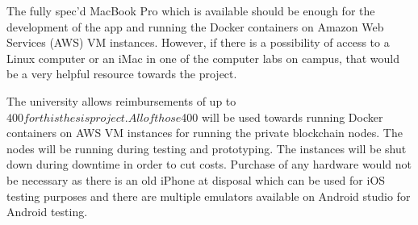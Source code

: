 \documentclass[a4paper,twoside,phd]{BYUPhys}
\begin{document}
The fully spec’d MacBook Pro which is available should be enough for the development of the app and running the Docker containers on Amazon Web Services (AWS) VM instances. However, if there is a possibility of access to a Linux computer or an iMac in one of the computer labs on campus, that would be a very helpful resource towards the project. \par
The university allows reimbursements of up to $400 for this thesis project. All of those $400 will be used towards running Docker containers on AWS VM instances for running the private blockchain nodes. The nodes will be running during testing and prototyping. The instances will be shut down during downtime in order to cut costs. Purchase of any hardware would not be necessary as there is an old iPhone at disposal which can be used for iOS testing purposes and there are multiple emulators available on Android studio for Android testing.
\end{document}

